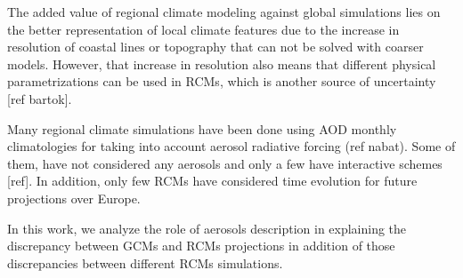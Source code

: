    The added value of regional climate modeling against global simulations lies on the better representation of local climate features due to the increase in resolution of coastal lines or topography that can not be solved with coarser models. However, that increase in resolution also means that different physical parametrizations can be used in RCMs, which is another source of uncertainty [ref bartok].





   Many regional climate simulations have been done using AOD monthly climatologies for taking into account aerosol radiative forcing (ref nabat). Some of them, have not considered any aerosols and only a few have interactive schemes [ref]. In addition, only few RCMs have considered time evolution for future projections over Europe.

   In this work, we analyze the role of aerosols description in explaining the discrepancy between GCMs and RCMs projections in addition of those discrepancies between different RCMs simulations.
   

